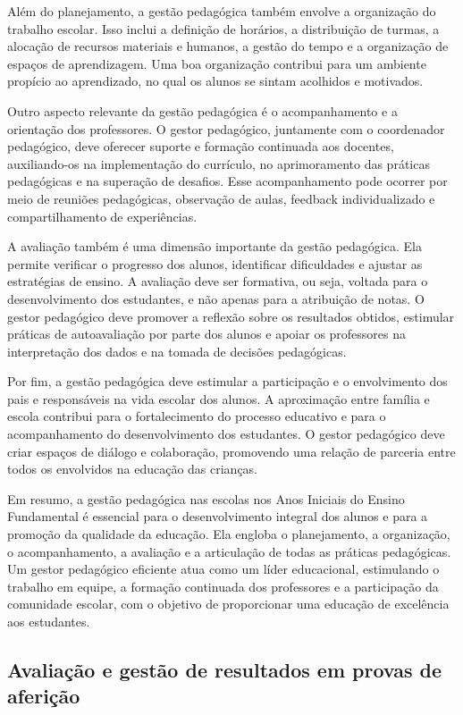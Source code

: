 Além do planejamento, a gestão pedagógica também envolve a organização
do trabalho escolar. Isso inclui a definição de horários, a distribuição
de turmas, a alocação de recursos materiais e humanos, a gestão do tempo
e a organização de espaços de aprendizagem. Uma boa organização
contribui para um ambiente propício ao aprendizado, no qual os alunos se
sintam acolhidos e motivados.

Outro aspecto relevante da gestão pedagógica é o acompanhamento e a
orientação dos professores. O gestor pedagógico, juntamente com o
coordenador pedagógico, deve oferecer suporte e formação continuada aos
docentes, auxiliando-os na implementação do currículo, no aprimoramento
das práticas pedagógicas e na superação de desafios. Esse acompanhamento
pode ocorrer por meio de reuniões pedagógicas, observação de aulas,
feedback individualizado e compartilhamento de experiências.

A avaliação também é uma dimensão importante da gestão pedagógica. Ela
permite verificar o progresso dos alunos, identificar dificuldades e
ajustar as estratégias de ensino. A avaliação deve ser formativa, ou
seja, voltada para o desenvolvimento dos estudantes, e não apenas para a
atribuição de notas. O gestor pedagógico deve promover a reflexão sobre
os resultados obtidos, estimular práticas de autoavaliação por parte dos
alunos e apoiar os professores na interpretação dos dados e na tomada de
decisões pedagógicas.

Por fim, a gestão pedagógica deve estimular a participação e o
envolvimento dos pais e responsáveis na vida escolar dos alunos. A
aproximação entre família e escola contribui para o fortalecimento do
processo educativo e para o acompanhamento do desenvolvimento dos
estudantes. O gestor pedagógico deve criar espaços de diálogo e
colaboração, promovendo uma relação de parceria entre todos os
envolvidos na educação das crianças.

Em resumo, a gestão pedagógica nas escolas nos Anos Iniciais do Ensino
Fundamental é essencial para o desenvolvimento integral dos alunos e
para a promoção da qualidade da educação. Ela engloba o planejamento, a
organização, o acompanhamento, a avaliação e a articulação de todas as
práticas pedagógicas. Um gestor pedagógico eficiente atua como um líder
educacional, estimulando o trabalho em equipe, a formação continuada dos
professores e a participação da comunidade escolar, com o objetivo de
proporcionar uma educação de excelência aos estudantes.

\subsection{Avaliação e gestão de resultados em provas de
aferição}\label{avaliauxe7uxe3o-e-gestuxe3o-de-resultados-em-provas-de-aferiuxe7uxe3o}

